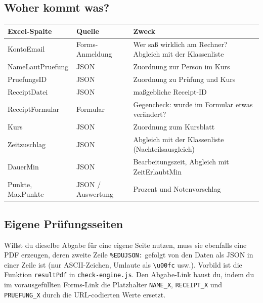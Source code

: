 \documentclass[11pt,a4paper,parskip=half]{scrartcl}
\newcommand{\feld}[1]{\texttt{\color{violett}#1}}
\begin{document}
\subsection*{Woher kommt was?}
\renewcommand{\arraystretch}{1.3}
\begin{tabularx}{\linewidth}{@{}>{\ttfamily\color{violett}}l l Y@{}}
\toprule
\normalfont\textbf{Excel-Spalte} & \textbf{Quelle} & \textbf{Zweck}\\
\midrule
KontoEmail       & Forms-Anmeldung & Wer saß wirklich am Rechner? Abgleich mit der Klassenliste\\
NameLautPruefung & JSON            & Zuordnung zur Person im Kurs\\
PruefungsID      & JSON            & Zuordnung zu Prüfung und Kurs\\
ReceiptDatei     & JSON            & maßgebliche Receipt-ID\\
ReceiptFormular  & Formular        & Gegencheck: wurde im Formular etwas verändert?\\
Kurs             & JSON            & Zuordnung zum Kursblatt\\
Zeitzuschlag     & JSON            & Abgleich mit der Klassenliste (Nachteilsausgleich)\\
DauerMin         & JSON            & Bearbeitungszeit, Abgleich mit ZeitErlaubtMin\\
Punkte, MaxPunkte& JSON / Auswertung & Prozent und Notenvorschlag\\
\bottomrule
\end{tabularx}

\subsection*{Eigene Prüfungsseiten}
Willst du dieselbe Abgabe für eine eigene Seite nutzen, muss sie ebenfalls eine PDF erzeugen, deren
zweite Zeile \texttt{\%EDUJSON:} gefolgt von den Daten als JSON in einer Zeile ist (nur ASCII-Zeichen,
Umlaute als \texttt{\textbackslash u00fc} usw.). Vorbild ist die Funktion \texttt{resultPdf} in
\feld{check-engine.js}. Den Abgabe-Link baust du, indem du im vorausgefüllten Forms-Link die Platzhalter
\feld{NAME\_X}, \feld{RECEIPT\_X} und \feld{PRUEFUNG\_X} durch die URL-codierten Werte ersetzt.
\end{document}
